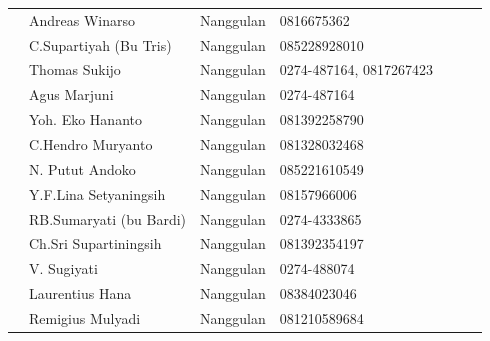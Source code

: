 \documentclass{article}
\begin{document}
\begin{flushleft}
\begin{supertabular}{|m{0.79800004cm}|m{3.5609999cm}|m{2.179cm}|m{2.658cm}|m{0.753cm}|m{-0.04100001cm}|m{0.689cm}|m{-0.04100001cm}|m{0.753cm}|}
 &
Andreas Winarso &
Nanggulan &
0816675362 &
 &
 &
\\
 &
C.Supartiyah (Bu Tris) &
Nanggulan &
085228928010 &
 &
 &
\\
 &
Thomas Sukijo &
Nanggulan &
0274-487164, 0817267423 &
 &
 &
\\
 &
Agus Marjuni &
Nanggulan &
0274-487164 &
 &
 &
\\
 &
Yoh. Eko Hananto &
Nanggulan &
081392258790 &
 &
 &
\\
 &
C.Hendro Muryanto &
Nanggulan &
081328032468 &
 &
 &
\\
 &
N. Putut Andoko &
Nanggulan &
085221610549 &
 &
 &
\\
 &
Y.F.Lina Setyaningsih &
Nanggulan &
08157966006 &
 &
 &
\\
 &
RB.Sumaryati (bu Bardi) &
Nanggulan &
0274-4333865 &
 &
 &
\\
 &
Ch.Sri Supartiningsih &
Nanggulan &
081392354197 &
 &
 &
\\
 &
V. Sugiyati &
Nanggulan &
0274-488074 &
 &
 &
\\
 &
Laurentius Hana &
Nanggulan &
08384023046 &
 &
 &
\\
 &
Remigius Mulyadi &
Nanggulan &
081210589684 &
 &
 &
\\

\end{supertabular}
\end{flushleft}
\end{document}
